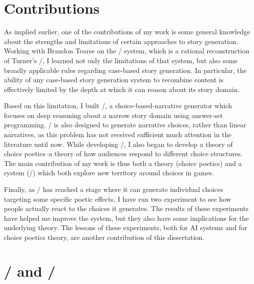 \section{Contributions}

As implied earlier, one of the contributions of my work is some general knowledge about the strengths and limitations of certain approaches to story generation.
%
Working with Brandon Tearse on the \skald/ system, which is a rational reconstruction of Turner's \minstrel/, I learned not only the limitations of that system, but also some broadly applicable rules regarding case-based story generation.
%
In particular, the ability of any case-based story generation system to recombine content is effectively limited by the depth at which it can reason about its story domain.


Based on this limitation, I built \dunyazad/, a choice-based-narrative generator which focuses on deep reasoning about a narrow story domain using answer-set programming.
%
\dunyazad/ is also designed to generate narrative choices, rather than linear narratives, as this problem has not received sufficient much attention in the literature until now.
%
While developing \dunyazad/, I also began to develop a theory of choice poetics--a theory of how audiences respond to different choice structures.
%
The main contribution of my work is thus both a theory (choice poetics) and a system (\dunyazad/) which both explore new territory around choices in games.


Finally, as \dunyazad/ has reached a stage where it can generate individual choices targeting some specific poetic effects, I have run two experiment to see how people actually react to the choices it generates.
%
The results of these experiments have helped me improve the system, but they also have some implications for the underlying theory.
%
The lessons of these experiments, both for AI systems and for choice poetics theory, are another contribution of this dissertation.



\section{\minstrel/ and \skald/}

